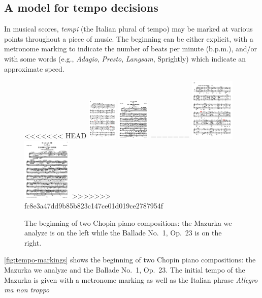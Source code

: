 \documentclass[aoas]{imsart}
\begin{document}
\subsection{A model for tempo decisions}


In musical scores, {\em tempi} (the Italian plural of tempo) may be
marked at various points throughout a piece of music. The
beginning can be either explicit, with a metronome marking to
indicate the number of beats per minute (b.p.m.), and/or with some words
(e.g., {\em Adagio}, {\em Presto}, {\em Langsam}, Sprightly) which indicate an
approximate speed. 
\begin{figure}[t!]
  \centering
<<<<<<< HEAD
  \includegraphics[height=2cm]{mazurka-top.pdf}
  \includegraphics[height=2cm]{ballade-top.pdf}
=======
  \includegraphics[height=3cm]{mazurka-top.pdf}
  \includegraphics[height=3cm]{ballade-top.pdf}
>>>>>>> fc8e3a47dd9b85b823c147ce01d019ce2787954f
  \caption{The beginning of two Chopin piano compositions: the Mazurka
    we analyze is on the left while the Ballade No.\ 1, Op.\ 23 is on
    the right.}
  \label{fig:tempo-markings}
\end{figure}
\autoref{fig:tempo-markings} shows the beginning of two Chopin piano
compositions: the Mazurka we analyze and the Ballade No.\ 1, Op.\
23. The initial tempo of the Mazurka is given with a metronome
marking as well as the Italian phrase {\em Allegro ma non troppo}
\end{document}
